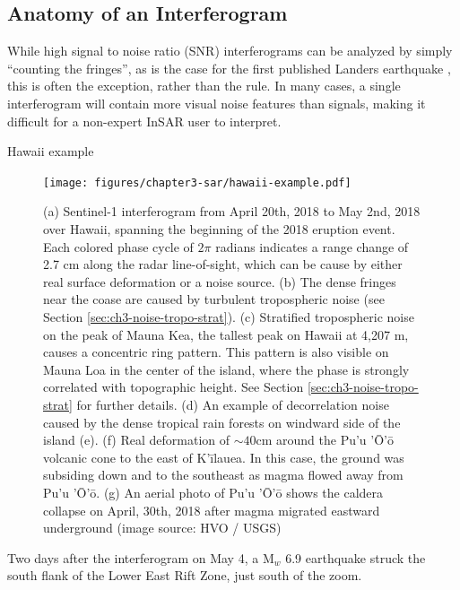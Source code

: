 \documentclass{utexasthesis}
\begin{document}
\subsection{Anatomy of an Interferogram}

While high signal to noise ratio (SNR) interferograms can be analyzed by simply ``counting the fringes'', as is the case for the first published Landers earthquake \cite{Massonnet1993DisplacementFieldLanders}, this is often the exception, rather than the rule.
In many cases, a single interferogram will contain more visual noise features than signals, making it difficult for a non-expert InSAR user to interpret. 

Hawaii example




\begin{figure}[!htbp]
	\centering
	\texttt{[image: figures/chapter3-sar/hawaii-example.pdf]}
	\caption[Sentinel-1 interferogram over Hawaii showing common noise sources, along with 2018 eruption deformation]{
	(a) Sentinel-1 interferogram from April 20th, 2018 to May 2nd, 2018 over Hawaii, spanning the beginning of the 2018 eruption event.
	Each colored phase cycle of $2\pi$ radians indicates a range change of 2.7 cm along the radar line-of-sight, which can be cause by either real surface deformation or a noise source.
	(b) The dense fringes near the coase are caused by turbulent tropospheric noise (see Section \ref{sec:ch3-noise-tropo-strat}).
	(c) Stratified tropospheric noise on the peak of Mauna Kea, the tallest peak on Hawaii at 4,207 m, causes a concentric ring pattern. This pattern is also visible on Mauna Loa in the center of the island, where the phase is strongly correlated with topographic height. See Section \ref{sec:ch3-noise-tropo-strat} for further details.
	(d) An example of decorrelation noise caused by the dense tropical rain forests on windward side of the island (e).
	(f) Real deformation of $ \sim 40 $cm around the Pu'u '\=O'\=o volcanic cone to the east of K'\=ilauea. In this case, the ground was subsiding down and to the southeast as magma flowed away from Pu'u '\=O'\=o.
	(g) An aerial photo of Pu'u '\=O'\=o shows the caldera collapse on April, 30th, 2018 after magma migrated eastward underground (image source: HVO / USGS)
 }
	\label{fig:sar-hawaii-example}
\end{figure}

Two days after the interferogram on May 4, a  M$_w$ 6.9 earthquake struck the south flank of the Lower East Rift Zone, just south of the zoom.
\end{document}
